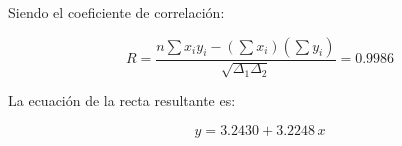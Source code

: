 \documentclass[letter,11pt]{article}
\begin{document}
Siendo el coeficiente de correlación:

\begin{equation*}
    R = \frac{n \sum x_i y_i - (\sum x_i)(\sum y_i)}{\sqrt{\Delta_1 \Delta_2}}
      = 0.9986
\end{equation*}
\vspace{0.10cm}

La ecuación de la recta resultante es:

\begin{equation*}
    y = \num{3.2430} + \num{3.2248}\, x
\end{equation*}
\vspace{0.10cm}
\end{document}
